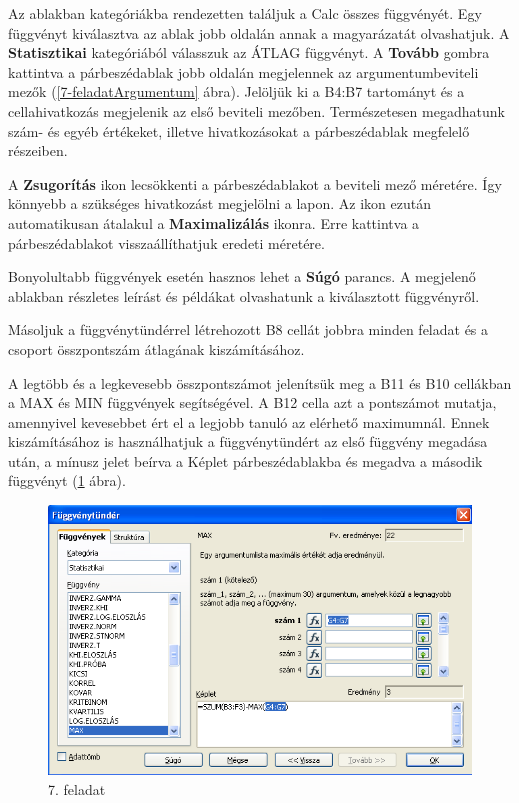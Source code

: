 Az ablakban kategóriákba rendezetten találjuk a Calc összes
függvényét. Egy függvényt kiválasztva az ablak jobb
oldalán annak a magyarázatát olvashatjuk. A \textbf{Statisztikai}
kategóriából válasszuk az ÁTLAG függvényt. A
\textbf{Tovább} gombra kattintva a párbeszédablak jobb oldalán
megjelennek az argumentumbeviteli mezők (\ref{7-feladatArgumentum} ábra).
Jelöljük ki a B4:B7 tartományt és a cellahivatkozás megjelenik az első
beviteli mezőben. Természetesen megadhatunk szám- és egyéb
értékeket, illetve hivatkozásokat a párbeszédablak megfelelő részeiben.  

A \textbf{Zsugorítás} ikon lecsökkenti a párbeszédablakot a
beviteli mező méretére. Így könnyebb a szükséges
hivatkozást megjelölni a lapon. Az ikon ezután automatikusan
átalakul a \textbf{Maximalizálás} ikonra. Erre kattintva a
párbeszédablakot visszaállíthatjuk eredeti méretére.

Bonyolultabb függvények esetén hasznos lehet a \textbf{Súgó}
parancs. A megjelenő ablakban részletes leírást és
példákat olvashatunk a kiválasztott függvényről.

Másoljuk a függvénytündérrel létrehozott B8 cellát jobbra
minden feladat és a csoport összpontszám átlagának
kiszámításához.

A legtöbb és a legkevesebb összpontszámot jelenítsük meg a
B11 és B10 cellákban a MAX és MIN függvények
segítségével. A B12 cella azt a pontszámot mutatja, amennyivel
kevesebbet ért el a legjobb tanuló az elérhető maximumnál.
Ennek kiszámításához is használhatjuk a
függvénytündért az első függvény megadása után, a
 mínusz jelet beírva a Képlet párbeszédablakba és megadva
a második függvényt (\ref{7-feladatMásodik} ábra).

\begin{figure}[!h]
\begin{center}
\includegraphics[width=15.999cm]{oocalcv2-img39.png}
\caption{ 7. feladat}\label{7-feladatMásodik}
\end{center}
\end{figure}

